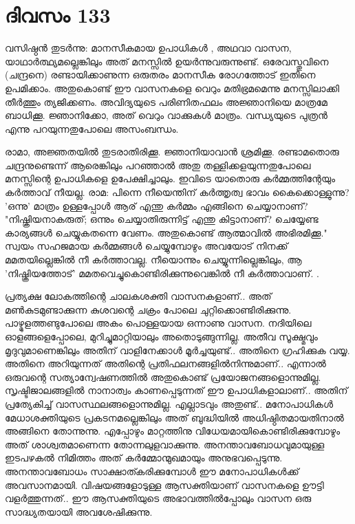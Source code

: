  
\section{ദിവസം 133}


വസിഷ്ഠന്‍ തുടര്‍ന്നു: മാനസീകമായ ഉപാധികള്‍ , അഥവാ വാസന, യാഥാര്‍ത്ഥ്യമല്ലെങ്കിലും അത്‌ മനസ്സില്‍ ഉയര്‍ന്നുവരുന്നുണ്ട്‌. ഒരേവസ്തുവിനെ (ചന്ദ്രനെ) രണ്ടായിക്കാണുന്ന ഒരുതരം മാനസീക രോഗത്തോട്‌ ഇതിനെ ഉപമിക്കാം. അതുകൊണ്ട്‌ ഈ വാസനകളെ വെറും മതിഭ്രമമെന്നു മനസ്സിലാക്കി തീര്‍ത്തും ത്യജിക്കണം. അവിദ്യയുടെ പരിണിതഫലം അജ്ഞാനിയെ മാത്രമേ ബാധിക്കൂ. ജ്ഞാനിക്കോ, അത്‌ വെറും വാക്കുകള്‍ മാത്രം. വന്ധ്യയുടെ പുത്രന്‍ എന്നു പറയുന്നതുപോലെ അസംബന്ധം.

രാമാ, അജ്ഞതയില്‍ തുടരാതിരിക്കൂ. ജ്ഞാനിയാവാന്‍ ശ്രമിക്കൂ. രണ്ടാമതൊരു ചന്ദ്രനുണ്ടെന്ന് ആരെങ്കിലും പറഞ്ഞാല്‍ അതു തള്ളിക്കളയുന്നതുപോലെ മനസ്സിന്റെ ഉപാധികളെ ഉപേക്ഷിച്ചാലും. ഇവിടെ യാതൊരു കര്‍മ്മത്തിന്റേയും കര്‍ത്താവ്‌ നീയല്ല. രാമ: പിന്നെ നീയെന്തിന്‌ കര്‍ത്തൃത്വ ഭാവം കൈക്കൊള്ളുന്നു? 'ഒന്നു' മാത്രം ഉള്ളപ്പോള്‍ ആര്‌ എന്തു കര്‍മ്മം എങ്ങിനെ ചെയ്യാനാണ്‌? "നിഷ്ക്രിയനാകരുത്‌; ഒന്നും ചെയ്യാതിരുന്നിട്ട്‌ എന്തു കിട്ടാനാണ്‌? ചെയ്യേണ്ട കാര്യങ്ങള്‍ ചെയ്യുകതന്നെ വേണം. അതുകൊണ്ട്‌ ആത്മാവില്‍ അഭിരമിക്കൂ." സ്വയം സഹജമായ കര്‍മ്മങ്ങള്‍ ചെയ്യുമ്പോഴും അവയോട്‌ നിനക്ക്‌ മമതയില്ലെങ്കില്‍ നീ കര്‍ത്താവല്ല. നീയൊന്നും ചെയ്യുന്നില്ലെങ്കിലും, ആ 'നിഷ്ക്രിയത്തോട്‌' മമതവെച്ചുകൊണ്ടിരിക്കുന്നുവെങ്കില്‍ നീ കര്‍ത്താവാണ്‌. .

പ്രത്യക്ഷ ലോകത്തിന്റെ ചാലകശക്തി വാസനകളാണ്‌.. അത്‌ മണ്‍കുടമുണ്ടാക്കുന്ന കുശവന്റെ ചക്രം പോലെ ചുറ്റിക്കൊണ്ടിരിക്കുന്നു. പാഴ്മുളത്തണ്ടുപോലെ അകം പൊള്ളയായ ഒന്നാണു വാസന. നദിയിലെ ഓളങ്ങളെപ്പോലെ, മുറിച്ചുമാറ്റിയാലും അതൊടുങ്ങുന്നില്ല. അതീവ സൂക്ഷ്മവും മൃദുവുമാണെങ്കിലും അതിന്‌ വാളിനേക്കാള്‍ മൂര്‍ച്ചയുണ്ട്‌.. അതിനെ ഗ്രഹിക്കുക വയ്യ. അതിനെ അറിയുന്നത്‌ അതിന്റെ പ്രതിഫലനങ്ങളില്‍നിന്നുമാണ്‌.. എന്നാല്‍ ഒരുവന്റെ സത്യാന്വേഷണത്തില്‍ അതുകൊണ്ട്‌ പ്രയോജനങ്ങളൊന്നുമില്ല. സൃഷ്ടിജാലങ്ങളില്‍ നാനാത്വം കാണപ്പെടുന്നത്‌ ഈ ഉപാധികളാലാണ്‌..  അതിന്‌ പ്രത്യേകിച്ച്‌ വാസസ്ഥലങ്ങളൊന്നുമില്ല. എല്ലാടവും അതുണ്ട്‌..  മനോപാധികള്‍ മേധാശക്തിയുടെ പ്രകടനമല്ലെങ്കിലും അത്‌ ബുദ്ധിയില്‍ അധിഷ്ഠിതമായതിനാല്‍ അങ്ങിനെ തോന്നുന്നു. എപ്പോഴും മാറ്റത്തിനു വിധേയമായികൊണ്ടിരിക്കുമ്പോഴും അത്‌ ശാശ്വതമാണെന്ന തോന്നലുളവാക്കുന്നു. അനന്താവബോധവുമായുള്ള ഇടപഴകല്‍ നിമിത്തം അത്‌ കര്‍മ്മോന്മുഖമായും അനുഭവപ്പെടുന്നു. അനന്താവബോധം സാക്ഷാത്കരിക്കുമ്പോള്‍ ഈ മനോപാധികള്‍ക്ക്‌ അവസാനമായി. വിഷയങ്ങളോടുള്ള ആസക്തിയാണ്‌ വാസനകളെ ഊട്ടി വളര്‍ത്തുന്നത്‌.. ഈ ആസക്തിയുടെ അഭാവത്തില്‍പ്പോലും വാസന ഒരു സാദ്ധ്യതയായി അവശേഷിക്കുന്നു. 

